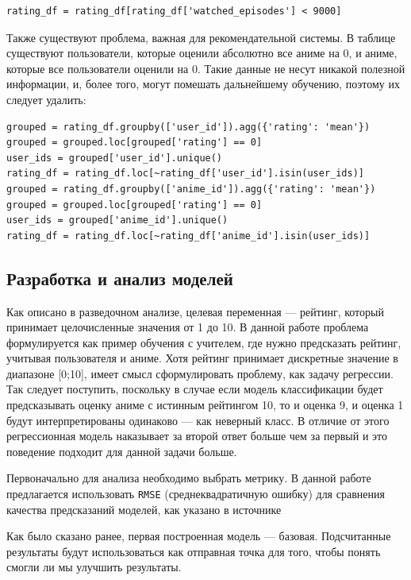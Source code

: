 \documentclass[bachelor, och, diploma]{SCWorks}
\begin{document}
\begin{verbatim}
rating_df = rating_df[rating_df['watched_episodes'] < 9000]
\end{verbatim}

Также существуют проблема, важная для рекомендательной системы. В таблице существуют пользователи, которые оценили абсолютно все аниме на 0, и аниме, которые все пользователи оценили на 0.  Такие данные не несут никакой полезной информации, и, более того, могут помешать дальнейшему обучению, поэтому их следует удалить:
\begin{verbatim}
grouped = rating_df.groupby(['user_id']).agg({'rating': 'mean'})
grouped = grouped.loc[grouped['rating'] == 0]
user_ids = grouped['user_id'].unique()
rating_df = rating_df.loc[~rating_df['user_id'].isin(user_ids)]
grouped = rating_df.groupby(['anime_id']).agg({'rating': 'mean'})
grouped = grouped.loc[grouped['rating'] == 0]
user_ids = grouped['anime_id'].unique()
rating_df = rating_df.loc[~rating_df['anime_id'].isin(user_ids)]
\end{verbatim}

\subsection{Разработка и анализ моделей}
Как описано в разведочном анализе, целевая переменная --- рейтинг, который принимает целочисленные значения от 1 до 10. В данной работе проблема формулируется как пример обучения с учителем, где нужно предсказать рейтинг, учитывая пользователя и аниме. Хотя рейтинг принимает дискретные значение в диапазоне [0;10], имеет смысл сформулировать проблему, как задачу регрессии. Так следует поступить, поскольку в случае если модель классификации будет предсказывать оценку аниме с истинным рейтингом 10, то и оценка 9,
 и оценка 1 будут интерпретированы одинаково --- как неверный класс. В отличие от этого регрессионная модель наказывает за второй ответ больше чем за первый и это поведение подходит для данной задачи больше.

Первоначально для анализа необходимо выбрать метрику. В данной работе предлагается использовать 
\verb|RMSE| (среднеквадратичную ошибку) для сравнения качества предсказаний  
моделей, как указано в источнике 

Как было сказано ранее, первая построенная модель --- базовая. Подсчитанные результаты будут использоваться как отправная точка для того, чтобы понять смогли ли мы улучшить результаты.
\end{document}
